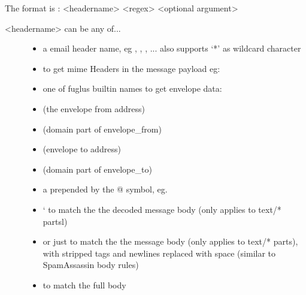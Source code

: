 \documentclass[letterpaper,10pt,english]{sphinxmanual}
\begin{document}
The format is : \textless{}headername\textgreater{} \textless{}regex\textgreater{} \textless{}optional argument\textgreater{}
\begin{description}
\item[{\textless{}headername\textgreater{} can be any of...}] \leavevmode\begin{itemize}
\item {} 
a email header name, eg , , ,  ... also supports `*' as wildcard character

\item {} 
 to get mime Headers in the message payload  eg: 

\item {} 
one of fuglus builtin names to get envelope data:

\end{itemize}
\begin{itemize}
\item {} 
  (the envelope from address)

\item {} 
 (domain part of envelope\_from)

\item {} 
 (envelope to address)

\item {} 
 (domain part of envelope\_to)

\end{itemize}
\begin{itemize}
\item {} 
a  prepended by the @ symbol, eg. 

\item {} 
` to match the the decoded message body (only applies to text/* partsl)

\item {} 
 or just  to match the the  message body (only applies to text/* parts), with stripped tags and newlines replaced with space (similar to SpamAssassin body rules)

\item {} 
 to match the full body

\end{itemize}

\end{description}
\end{document}
